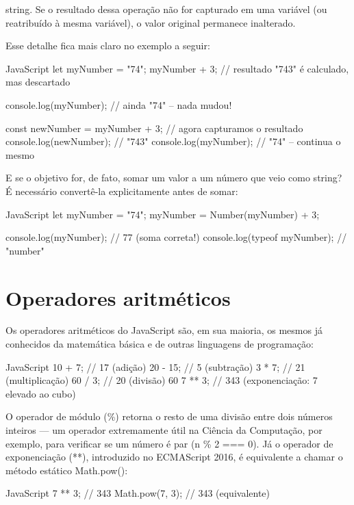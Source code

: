 string. Se o resultado dessa operação não for capturado em uma variável (ou reatribuído à mesma variável), o valor original permanece inalterado.

Esse detalhe fica mais claro no exemplo a seguir:

\begin{codebox}{JavaScript}
let myNumber = "74";
myNumber + 3;                 // resultado "743" é calculado, mas descartado

console.log(myNumber);        // ainda "74" -- nada mudou!

const newNumber = myNumber + 3; // agora capturamos o resultado
console.log(newNumber);         // "743"
console.log(myNumber);          // "74" -- continua o mesmo
\end{codebox}

E se o objetivo for, de fato, somar um valor a um número que veio como string? É necessário convertê-la explicitamente antes de somar:

\begin{codebox}{JavaScript}
let myNumber = "74";
myNumber = Number(myNumber) + 3;

console.log(myNumber);        // 77 (soma correta!)
console.log(typeof myNumber); // "number"
\end{codebox}

\section{Operadores aritméticos}

Os operadores aritméticos do JavaScript são, em sua maioria, os mesmos já conhecidos da matemática básica e de outras linguagens de programação:

\begin{codebox}{JavaScript}
10 + 7;      // 17 (adição)
20 - 15;     // 5   (subtração)
3 * 7;       // 21 (multiplicação)
60 / 3;      // 20 (divisão)
60 %
7 ** 3;      // 343 (exponenciação: 7 elevado ao cubo)
\end{codebox}

O operador de módulo (\%) retorna o resto de uma divisão entre dois números inteiros — um operador extremamente útil na Ciência da Computação, por exemplo, para verificar se um número é par (n \% 2 === 0). Já o operador de exponenciação (**), introduzido no ECMAScript 2016, é equivalente a chamar o método estático Math.pow():

\begin{codebox}{JavaScript}
7 ** 3;         // 343
Math.pow(7, 3); // 343 (equivalente)
\end{codebox}

